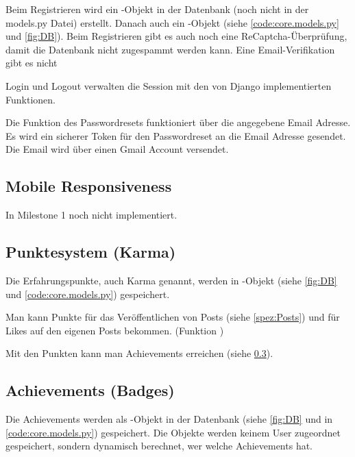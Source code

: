 Beim Registrieren wird ein -Objekt in der Datenbank (noch nicht in der
models.py Datei) erstellt. Danach auch ein -Objekt (siehe
\ref{code:core.models.py} und \ref{fig:DB}). Beim Registrieren gibt es auch noch
eine ReCaptcha-Überprüfung, damit die Datenbank nicht zugespammt werden kann. Eine Email-Verifikation gibt es nicht

Login und Logout verwalten die Session mit den von Django implementierten
Funktionen.

Die Funktion des Passwordresets funktioniert über die angegebene Email Adresse.
Es wird ein sicherer Token für den Passwordreset an die Email Adresse gesendet.
Die Email wird über einen Gmail Account versendet.

\subsection{Mobile Responsiveness} \label{spez:Mobile}

In Milestone 1 noch nicht implementiert.

\subsection{Punktesystem (Karma)} \label{spez:Karma}

Die Erfahrungspunkte, auch Karma genannt, werden in -Objekt (siehe
\ref{fig:DB} und \ref{code:core.models.py}) gespeichert.

Man kann Punkte für das Veröffentlichen von Posts (siehe \ref{spez:Posts}) und für
Likes auf den eigenen Posts bekommen. (Funktion )

Mit den Punkten kann man Achievements erreichen (siehe \ref{spez:Badges}).

\subsection{Achievements (Badges)} \label{spez:Badges}

Die Achievements werden als -Objekt in der Datenbank (siehe \ref{fig:DB} und in
\ref{code:core.models.py}) gespeichert. Die Objekte werden keinem User
zugeordnet gespeichert, sondern dynamisch berechnet, wer welche Achievements
hat.

